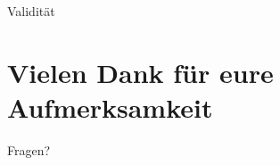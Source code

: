 \documentclass[10pt]{beamer}
\begin{document}
	\begin{frame}{Validität}

	\end{frame}	

\section{Vielen Dank für eure Aufmerksamkeit}

\appendix

	\begin{frame}[standout]
		Fragen?
	\end{frame}


%		
%		


\end{document}
